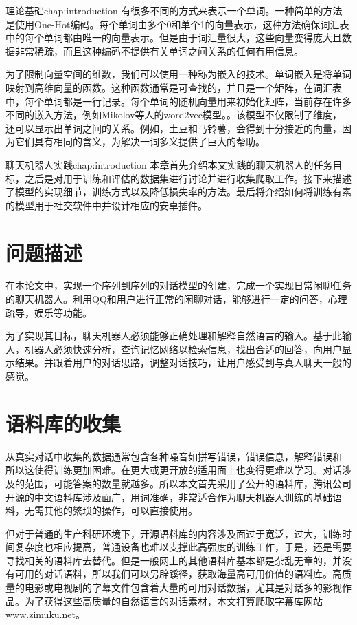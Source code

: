 \begin{cuzchapter}{理论基础}{chap:introduction}
有很多不同的方式来表示一个单词。一种简单的方法是使用One-Hot编码\cite{马广才2011状态机编码的低功耗设计}。每个单词由多个0和单个1的向量表示，这种方法确保词汇表中的每个单词都由唯一的向量表示。但是由于词汇量很大，这些向量变得庞大且数据非常稀疏，而且这种编码不提供有关单词之间关系的任何有用信息。

为了限制向量空间的维数，我们可以使用一种称为嵌入的技术。单词嵌入是将单词映射到高维向量的函数\cite{Bengio2006Neural}。这种函数通常是可查找的，并且是一个矩阵，在词汇表中，每个单词都是一行记录。每个单词的随机向量用来初始化矩阵，当前存在许多不同的嵌入方法，例如Mikolov等人的word2vec模型。\cite{DBLP:journals/corr/MikolovSCCD13}。该模型不仅限制了维度，还可以显示出单词之间的关系。例如，土豆和马铃薯，会得到十分接近的向量，因为它们具有相同的含义，为解决一词多义提供了巨大的帮助。
\end{cuzchapter}
\begin{cuzchapter}{聊天机器人实践}{chap:introduction}
本章首先介绍本文实践的聊天机器人的任务目标，之后是对用于训练和评估的数据集进行讨论并进行收集爬取工作。接下来描述了模型的实现细节，训练方式以及降低损失率的方法。最后将介绍如何将训练有素的模型用于社交软件中并设计相应的安卓插件。
\section{问题描述}\label{sec:background}
在本论文中，实现一个序列到序列的对话模型的创建，完成一个实现日常闲聊任务的聊天机器人。利用QQ和用户进行正常的闲聊对话，能够进行一定的问答，心理疏导，娱乐等功能。

为了实现其目标，聊天机器人必须能够正确处理和解释自然语言的输入。基于此输入，机器人必须快速分析，查询记忆网络以检索信息，找出合适的回答，向用户显示结果。并跟着用户的对话思路，调整对话技巧，让用户感受到与真人聊天一般的感觉。
\section{语料库的收集}\label{sec:background}
从真实对话中收集的数据通常包含各种噪音如拼写错误，错误信息，解释错误和
所以这使得训练更加困难。在更大或更开放的适用面上也变得更难以学习。对话涉及的范围，可能答案的数量就越多。所以本文首先采用了公开的语料库，腾讯公司开源的中文语料库涉及面广，用词准确，非常适合作为聊天机器人训练的基础语料，无需其他的繁琐的操作，可以直接使用。

但对于普通的生产科研环境下，开源语料库的内容涉及面过于宽泛，过大，训练时间复杂度也相应提高，普通设备也难以支撑此高强度的训练工作，于是，还是需要寻找相关的语料库去替代。但是一般网上的其他语料库基本都是杂乱无章的，并没有可用的对话语料，所以我们可以另辟蹊径，获取海量高可用价值的语料库。高质量的电影或电视剧的字幕文件包含着大量的可用对话数据，尤其是对话多的影视作品。为了获得这些高质量的自然语言的对话素材，本文打算爬取字幕库网站www.zimuku.net。


\end{cuzchapter}
